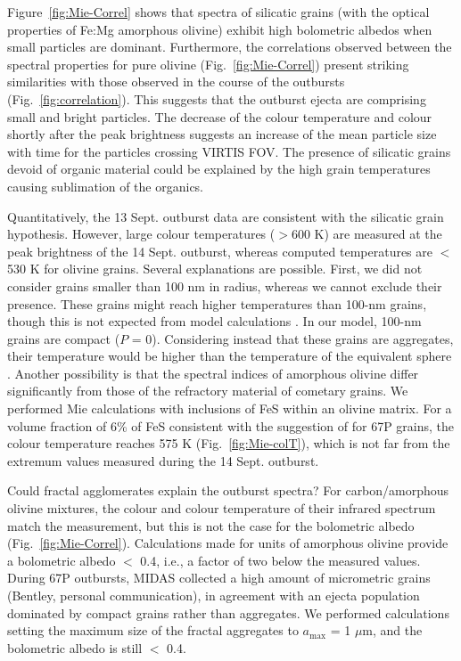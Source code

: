 \documentclass[a4paper,fleqn,usenatbib]{mnras}
\begin{document}
Figure~\ref{fig:Mie-Correl} shows that spectra of silicatic grains (with the optical properties of Fe:Mg amorphous olivine) exhibit high bolometric albedos when small particles are dominant. Furthermore, the correlations observed between the spectral properties for pure olivine (Fig.~\ref{fig:Mie-Correl}) present striking similarities with those observed in the course of the outbursts (Fig.~\ref{fig:correlation}). This
suggests that the outburst ejecta are comprising small and bright particles. The decrease of the colour temperature and colour shortly after the peak brightness suggests an increase of the mean particle size with time for the particles crossing VIRTIS FOV. The presence of silicatic grains devoid of organic material could be explained by the high grain temperatures causing sublimation of the organics.


Quantitatively, the 13 Sept. outburst data are consistent with  the silicatic grain hypothesis. However, large colour temperatures ($>$600 K) are measured at the peak brightness of the 14 Sept. outburst, whereas computed temperatures are $<$ 530 K for olivine grains. Several explanations are possible. First, we did not consider grains smaller than 100 nm in radius, whereas we cannot exclude their presence. These grains might reach higher temperatures than 100-nm grains, though this is not expected from model calculations \citep{Lasue2007}. In our model, 100-nm grains are compact ($P$ = 0). Considering instead that these grains are aggregates, their temperature would be higher than the temperature of the equivalent sphere \citep{Xing1997}. Another possibility is that the spectral indices of amorphous olivine differ significantly from those of the refractory material of cometary grains. We performed Mie calculations with inclusions of FeS  within an olivine matrix. For a volume fraction of 6\% of FeS consistent with the suggestion of \citet{Fulle2016} for 67P grains, the colour temperature reaches 575 K (Fig.~\ref{fig:Mie-colT}), which is not far from the extremum values measured during the 14 Sept. outburst.


Could fractal agglomerates explain the outburst spectra? For carbon/amorphous olivine  mixtures,  the colour and colour temperature of their infrared spectrum match the measurement, but this is not the case for the bolometric albedo (Fig.~\ref{fig:Mie-Correl}). Calculations made for units of amorphous olivine provide a bolometric albedo $<$ 0.4, i.e., a factor of two below the measured values. During 67P outbursts, MIDAS collected a high amount of micrometric grains  (Bentley, personal communication), in agreement with an ejecta population dominated by compact grains rather than aggregates.  We performed calculations setting the maximum size of the fractal aggregates to $a_{\max}$ = 1 $\mu$m, and the bolometric albedo is still $<$ 0.4.
\end{document}
